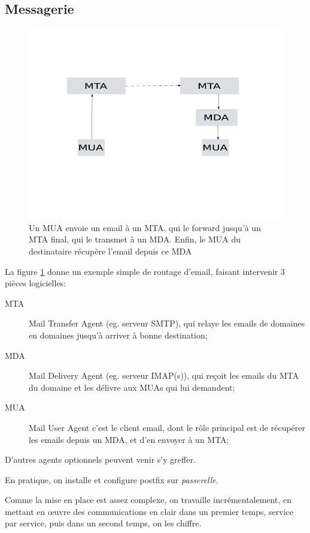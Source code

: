 \documentclass[a4paper]{article}
\begin{document}
\subsection{Messagerie}
\begin{figure}[!ht]
	\centering
	\includegraphics[scale=.5]{emailrouting.png}
	\caption{\label{emailrouting} Un MUA envoie un email à un MTA, qui
		le forward jusqu'à un MTA final, qui le transmet à un MDA.
		Enfin, le MUA du destinataire récupère l'email depuis ce MDA}
\end{figure}

La figure \ref{emailrouting} donne un exemple simple de routage d'email,
faisant intervenir $3$ pièces logicielles:
\begin{description}
	\item[MTA] Mail Transfer Agent (eg. serveur SMTP), qui relaye les
		emails de domaines en domaines jusqu'à arriver à bonne destination;
	\item[MDA] Mail Delivery Agent (eg. serveur IMAP(s)), qui reçoit les emails
		du MTA du domaine et les délivre aux MUAs qui lui demandent;
	\item[MUA] Mail User Agent c'est le client email, dont le rôle principal
		est de récupérer les emails depuis un MDA, et d'en envoyer à un MTA;
\end{description}
D'autres agents optionnels peuvent venir s'y greffer.

En pratique, on installe et configure postfix sur \textit{passerelle}.

Comme la mise en place est assez complexe, on travaille incrémentalement,
en mettant en œuvre des communications en clair dans un premier temps,
service par service, puis dans un second temps, on les chiffre.
\end{document}
